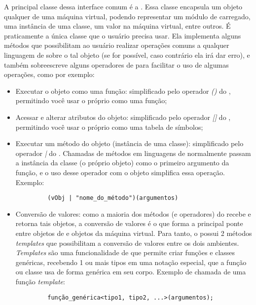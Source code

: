   A principal classe dessa interface comum é a \VObj{}. Essa classe 
  encapsula um objeto qualquer de uma máquina virtual, podendo representar um
  módulo de \script{} carregado, uma instância de uma classe, um valor na máquina
  virtual, entre outros. É praticamente a única classe que o usuário precisa 
  usar. Ela implementa alguns métodos que possibilitam ao usuário realizar 
  operações comuns a qualquer linguagem de \script{} sobre o tal objeto (se for
  possível, caso contrário ela irá dar erro), e também sobreescreve alguns operadores
  de \CXX{} para facilitar o uso de algumas operações, como por exemplo:
  \begin{itemize}
     \item Executar o objeto como uma função: simplificado pelo operador \emph{()}
       do \CXX{}, permitindo você usar o próprio \VObj{} como uma função;
     \item Acessar e alterar atributos do objeto: simplificado pelo operador
       \emph{[]} do \CXX{}, permitindo você usar o próprio \VObj{} como uma
       tabela de símbolos;
     \item Executar um método do objeto (instância de uma classe): simplificado pelo
       operador \emph{|} do \CXX{}. Chamadas de métodos em linguagens de \script{} normalmente
       passam a instância da classe (o próprio objeto) como o primeiro argumento da
       função, e o uso desse operador com o objeto simplifica essa operação. Exemplo: 
       \begin{verbatim}
         (vObj | "nome_do_método")(argumentos)
       \end{verbatim}
     \item Conversão de valores: como a maioria dos métodos (e operadores) do \VObj{}
       recebe e retorna tais objetos, a conversão de valores é o que forma a principal
       ponte entre objetos de \CXX{} e objetos da máquina virtual. Para tanto, o \VObj{}
       possui 2 métodos \textit{templates} que possibilitam a conversão de valores entre
       os dois ambientes. \textit{Templates} são uma funcionalidade de \CXX{} que permite
       criar funções e classes genéricas, recebendo 1 ou mais tipos\footnotemark{} em uma notação especial,
       que a função ou classe usa de forma genérica em seu corpo. Exemplo de chamada de uma
       função \textit{template}:
       \begin{verbatim}
         função_genérica<tipo1, tipo2, ...>(argumentos);
       \end{verbatim}
       
  \end{itemize}
  
